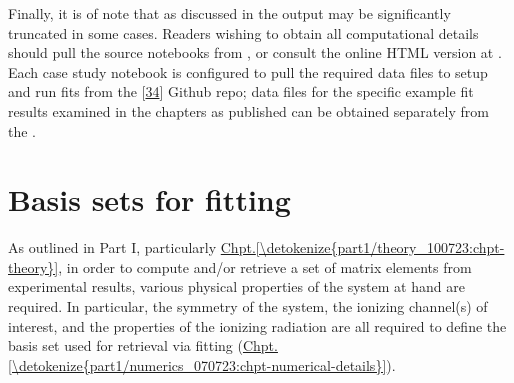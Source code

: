 \documentclass[letterpaper,table,10pt,english]{jupyterBook}
\begin{document}
\sphinxAtStartPar
Finally, it is of note that \sphinxhyphen{} as discussed in the {\hyperref[\detokenize{frontmatter/book_versions_note:chpt-book-versions}]{}} \sphinxhyphen{} output may be significantly truncated in some cases. Readers wishing to obtain all computational details should pull the source notebooks from , or consult the online HTML version at . Each case study notebook is configured to pull the required data files to setup and run fits from the  {[}\hyperlink{cite.backmatter/bibliography:id608}{34}{]} Github repo; data files for the specific example fit results examined in the chapters as published can be obtained separately from the .

\sphinxstepscope


\chapter{Basis sets for fitting}
\label{\detokenize{part2/sym-fitting-intro_240723:basis-sets-for-fitting}}\label{\detokenize{part2/sym-fitting-intro_240723:sect-basis-sets-fitting-intro}}\label{\detokenize{part2/sym-fitting-intro_240723::doc}}
\sphinxAtStartPar
As outlined in Part I, particularly \hyperref[\detokenize{part1/theory_100723:chpt-theory}]{Chpt.\@ \ref{\detokenize{part1/theory_100723:chpt-theory}}}, in order to compute and/or retrieve a set of matrix elements from experimental results, various physical properties of the system at hand are required. In particular, the symmetry of the system, the ionizing channel(s) of interest, and the properties of the ionizing radiation are all required to define the basis set used for {\hyperref[\detokenize{backmatter/glossary:term-radial-matrix-elements}]{}} retrieval via fitting (\hyperref[\detokenize{part1/numerics_070723:chpt-numerical-details}]{Chpt.\@ \ref{\detokenize{part1/numerics_070723:chpt-numerical-details}}}).
\end{document}
